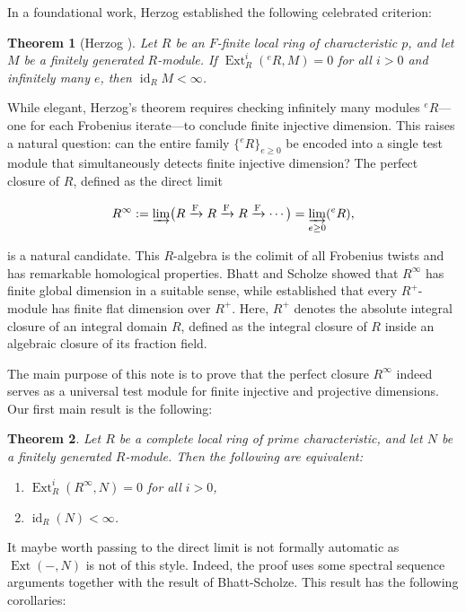 \documentclass[11pt,a4paper]{amsart}
\numberwithin{equation}{section}
\newtheorem{theorem}{Theorem}[section]
\theoremstyle{definition}
\theoremstyle{remark}
\newcommand{\Ext}{\operatorname{Ext}}
\begin{document}
In a foundational work, Herzog \cite{her} established the following celebrated criterion:

\begin{theorem}[Herzog \cite{her}]
	\label{thm:herzog}
	Let \(R\) be an \(F\)-finite local ring of characteristic \(p\), and let \(M\) be a finitely generated \(R\)-module. If \(\operatorname{Ext}_R^i({}^e R, M) = 0\) for all \(i > 0\) and infinitely many \(e\), then \(\operatorname{id}_R M < \infty\).
\end{theorem}

While elegant, Herzog's theorem requires checking infinitely many modules \({}^e R\)—one for each Frobenius iterate—to conclude finite injective dimension. This raises a natural question: can the entire family \(\{{}^e R\}_{e \ge 0}\) be encoded into a single test module that simultaneously detects finite injective dimension?
The perfect closure of \(R\), defined as the direct limit

\[
R^\infty := \varinjlim \bigl( R \xrightarrow{\mathrm{F}} R \xrightarrow{\mathrm{F}} R \xrightarrow{\mathrm{F}} \cdots \bigr)
= \varinjlim_{e \ge 0} ({}^e R),
\]

is a natural candidate. This \(R\)-algebra is the colimit of all Frobenius twists and has remarkable homological properties. Bhatt and Scholze \cite{BS1} showed that \(R^\infty\) has finite global dimension in a suitable sense, while   \cite{moh} established that every \(R^+\)-module has finite flat dimension over \(R^+\). Here, \(R^+\) denotes the absolute integral closure of an integral domain \(R\), defined as the integral closure of \(R\) inside an algebraic closure of its fraction field.

The main purpose of this note is to prove that the perfect closure \(R^\infty\) indeed serves as a universal test module for finite injective and projective dimensions. Our first main result is the following:

\begin{theorem}
	\label{thm:main1}
	Let \(R\) be a complete local ring of prime characteristic, and let \(N\) be a finitely generated \(R\)-module. Then the following are equivalent:
	\begin{enumerate}
		\item \(\operatorname{Ext}_R^i(R^\infty, N) = 0\) for all \(i > 0\),
		\item \(\operatorname{id}_R(N) < \infty\).
	\end{enumerate}
\end{theorem}
It maybe worth passing to the direct limit is not formally automatic as $\Ext(-,N)$ is not of this style. Indeed, the proof uses some spectral sequence
arguments together with the result of Bhatt-Scholze.
This result has the following corollaries:
\end{document}
